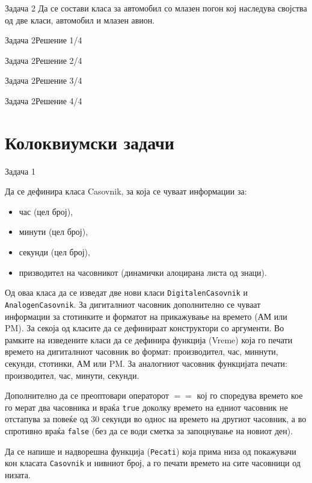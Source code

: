 \begin{frame}{Задача 2}
Да се состави класа за автомобил со млазен погон кој наследува својства од две класи, автомобил и млазен авион.
\end{frame}

\begin{frame}[fragile]{Задача 2}{Решение 1/4}

\end{frame}

\begin{frame}[fragile]{Задача 2}{Решение 2/4}

\end{frame}

\begin{frame}[fragile]{Задача 2}{Решение 3/4}

\end{frame}

\begin{frame}[fragile]{Задача 2}{Решение 4/4}

\end{frame}

\section{Колоквиумски задачи}

\begin{frame}{Задача 1}
\begin{scriptsize}
Да се дефинира класа Casovnik, за која се чуваат информации за:
\begin{itemize}
  \item час (цел број),
  \item минути (цел број),
  \item секунди (цел број),
  \item призводител на часовникот (динамички алоцирана листа од знаци).
\end{itemize}
Од оваа класа да се изведат две нови класи \texttt{DigitalenCasovnik} и \texttt{AnalogenCasovnik}.
За дигиталниот часовник дополнително се чуваат информации за стотинките и
форматот на прикажување на времето (АМ или PM). За секоја од класите да се
дефинираат конструктори со аргументи. Во рамките на изведените класи да се
дефинира функција (Vreme) која го печати времето на дигиталниот часовник во
формат: производител, час, миннути, секунди, стотинки, АМ или PM. 
За аналогниот часовник функцијата печати: производител, час, минути, секунди.

Дополнително да се преоптовари операторот $==$ кој го споредува времето кое го
мерат два часовника и враќа \texttt{true} доколку времето на едниот часовник не
отстапува за повеќе од 30 секунди во однос на времето на другиот часовник, а во
спротивно враќа \texttt{false} (без да се води сметка за запоцнување на новиот
ден). 

Да се напише и надворешна функција (\texttt{Pecati}) која прима низа од
покажувачи кон класата \texttt{Casovnik} и нивниот број, а го печати времето на сите
часовници од низата.

\end{scriptsize}
\end{frame}

